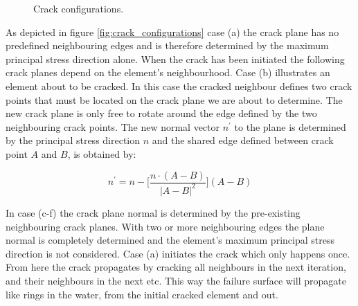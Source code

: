 \begin{figure}[h]
{  \label{fig:crack_configuration_4}}
 \caption{Crack configurations.}
 \label{fig:crack_configurations}
\end{figure}

As depicted in figure \vref{fig:crack_configurations} case (a) the
crack plane has no predefined neighbouring edges and is therefore
determined by the maximum principal stress direction alone. When the crack
has been initiated the following crack planes depend on the
element's neighbourhood. Case (b)
illustrates an element about to be 
cracked. In this case the cracked neighbour defines two crack points
that must be located on the crack plane we are about to determine. The
new crack plane is only free to rotate around the edge defined by the
two neighbouring crack points.
The new normal vector $n^{\prime}$ to the plane is determined by the principal stress
direction $n$ and the shared edge defined between crack point $A$ and $B$,
is obtained by:

\begin{equation}
n^{\prime} = n - \biggl[ \frac{n \cdot (A - B)}{|A - B|^2} \biggr] (A - B)
\end{equation}

In case (c-f) the crack plane normal is determined by the pre-existing
neighbouring crack planes. With two or more neighbouring edges the
plane normal is completely determined and the element's maximum
principal stress direction is not considered. Case (a) initiates the
crack which only happens once. From here the crack propagates by
cracking all neighbours in the next iteration, and their neighbours in
the next etc. This way the failure surface will propagate like rings
in the water, from the initial cracked element and out. 